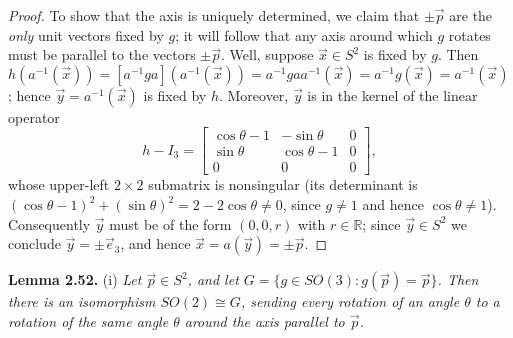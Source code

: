 \documentclass[leqno]{book}
\begin{document}
\begin{proof}
To show that the axis is uniquely determined, we claim that $\pm\vec p$ are the \emph{only} unit vectors fixed by $g$; it will follow that any axis around which $g$ rotates must be parallel to the vectors $\pm\vec p$.  Well, suppose $\vec x\in S^2$ is fixed by $g$.  Then $h(a^{-1}(\vec x))=[a^{-1}ga](a^{-1}(\vec x))=a^{-1}gaa^{-1}(\vec x)=a^{-1}g(\vec x)=a^{-1}(\vec x)$; hence $\vec y=a^{-1}(\vec x)$ is fixed by $h$.  Moreover, $\vec y$ is in the kernel of the linear operator
$$h-I_3=\begin{bmatrix}\cos\theta-1&-\sin\theta&0\\\sin\theta&\cos\theta-1&0\\0&0&0\end{bmatrix},$$
whose upper-left $2\times 2$ submatrix is nonsingular (its determinant is $(\cos\theta-1)^2+(\sin\theta)^2=2-2\cos\theta\ne 0$, since $g\ne 1$ and hence $\cos\theta\ne 1$).  Consequently $\vec y$ must be of the form $(0,0,r)$ with $r\in\mathbb R$; since $\vec y\in S^2$ we conclude $\vec y=\pm\vec e_3$, and hence $\vec x=a(\vec y)=\pm\vec p$.
\end{proof}
\noindent\textbf{Lemma 2.52.} (i) \emph{Let $\vec p\in S^2$, and let $G=\{g\in SO(3):g(\vec p)=\vec p\}$.  Then there is an isomorphism $SO(2)\cong G$, sending every rotation of an angle $\theta$ to a rotation of the same angle $\theta$ around the axis parallel to $\vec p$.}
\end{document}
